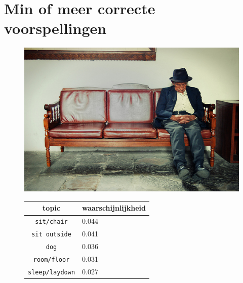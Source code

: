\section{Min of meer correcte voorspellingen}
\begin{figure}[h]
    \centering
    \begin{minipage}[t]{.5\linewidth}
    \centering
    \vspace{0pt}
    \includegraphics[width=\textwidth]{Images/LDA/4862204000.jpg}
    \end{minipage}\hfill
    \begin{minipage}[t]{.5\textwidth}
    \centering
    \vspace{0pt}
    \begin{tabular}{cl}
            topic                           & waarschijnlijkheid\\
            \hline
            \texttt{sit/chair}             & 0.044 \\
            \texttt{sit outside}                   & 0.041 \\
            \texttt{dog}                 & 0.036 \\
            \texttt{room/floor}           & 0.031 \\
            \texttt{sleep/laydown}        & 0.027\\
            \hline
        \end{tabular}
    \end{minipage}
\end{figure}

